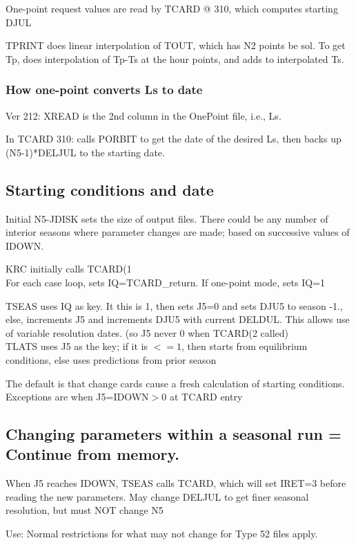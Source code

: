\documentclass{article}
\begin{document}
One-point request values are read by TCARD @ 310, which computes starting DJUL

TPRINT does linear interpolation of TOUT, which has N2 points be sol. To get Tp,
does interpolation of Tp-Ts at the hour points, and adds to interpolated Ts.
 \subsubsection{How one-point converts Ls to date}
 Ver 212: 
XREAD is the 2nd column in the OnePoint file, i.e., Ls. 

In TCARD 310: calls PORBIT to get the date of the desired Ls, then backs up
(N5-1)*DELJUL to the starting date.

\subsection{Starting conditions and date}%

Initial N5-JDISK sets the size of output files. There could be any number of
interior seasons where parameter changes are made; based on successive values of
IDOWN.

KRC initially calls TCARD(1  \\
For each case loop, sets IQ=TCARD\_return. If one-point mode, sets IQ=1

TSEAS uses IQ as key. It this is 1, then sets J5=0 and sets DJU5 to season -1.,
else, increments J5 and increments DJU5 with current DELDUL. This allows use of
variable resolution dates. (so J5 never 0 when TCARD(2 called) \\

TLATS uses J5 as the key; if it is $<= 1$, then starts from equilibrium
conditions, else uses predictions from prior season

The default is that change cards cause a fresh calculation of starting
conditions. Exceptions are when J5=IDOWN$>0$ at TCARD entry

\subsection{Changing parameters within a seasonal run = Continue from memory.}%

When J5 reaches IDOWN, TSEAS calls TCARD, which will set IRET=3 before reading
the new parameters. May change DELJUL to get finer seasonal resolution, but must
NOT change N5

Use: Normal restrictions for what may not change for Type 52 files apply.
\end{document}

